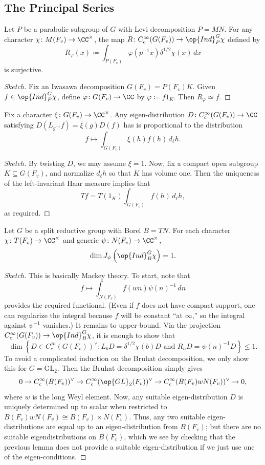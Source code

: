 \documentclass{article}
\begin{document}
\subsection{The Principal Series}
\begin{lemma}
	Let $P$ be a parabolic subgroup of $G$ with Levi decomposition $P=MN$. For any character $\chi\colon M(F_v)\to\CC^\times$, the map $R\colon C_c^\infty(G(F_v))\to\op{Ind}_P^G\chi$ defined by
	\[R_\varphi(x)\coloneqq\int_{P(F_v)}\varphi\left(p^{-1}x\right)\delta^{1/2}\chi(x)\,dx\]
	is surjective.
\end{lemma}
\begin{proof}[Sketch]
	Fix an Iwasawa decomposition $G(F_v)=P(F_v)K$. Given $f\in\op{Ind}_P^G\chi$, define $\varphi\colon G(F_v)\to\CC$ by $\varphi\coloneqq f1_K$. Then $R_\varphi\simeq f$.
\end{proof}
\begin{lemma}
	Fix a character $\xi\colon G(F_v)\to\CC^\times$. Any eigen-distribution $D\colon C_c^\infty(G(F_v))\to\CC$ satisfying $D(L_{g^{-1}}f)=\overline\xi(g)D(f)$ has is proportional to the distribution
	\[f\mapsto\int_{G(F_v)}\xi(h)f(h)\,d_\ell h.\]
\end{lemma}
\begin{proof}[Sketch]
	By twisting $D$, we may assume $\xi=1$. Now, fix a compact open subgroup $K\subseteq G(F_v)$, and normalize $d_\ell h$ so that $K$ has volume one. Then the uniqueness of the left-invariant Haar measure implies that
	\[Tf=T(1_K)\int_{G(F_v)}f(h)\,d_\ell h,\]
	as required.
\end{proof}
\begin{proposition}
	Let $G$ be a split reductive group with Borel $B=TN$. For each character $\chi\colon T(F_v)\to\CC^\times$ and generic $\psi\colon N(F_v)\to\CC^\times$,
	\[\dim J_\psi\left(\op{Ind}_B^G\chi\right)=1.\]
\end{proposition}
\begin{proof}[Sketch]
	This is basically Mackey theory. To start, note that
	\[f\mapsto\int_{N(F_v)}f(wn)\psi(n)^{-1}\,dn\]
	provides the required functional. (Even if $f$ does not have compact support, one can regularize the integral because $f$ will be constant ``at $\infty$,'' so the integral against $\psi^{-1}$ vanishes.) It remains to upper-bound. Via the projection $C_c^\infty(G(F_v))\to\op{Ind}_B^G\chi$, it is enough to show that
	\[\dim\left\{D\in C_c^\infty(G(F_v))^\lor:L_bD=\delta^{1/2}\chi(b)D\text{ and }R_nD=\psi(n)^{-1}D\right\}\le1.\]
	To avoid a complicated induction on the Bruhat decomposition, we only show this for $G=\mathrm{GL}_2$. Then the Bruhat decomposition simply gives
	\[0\to C_c^\infty(B(F_v))^\lor\to C_c^\infty(\op{GL}_2(F_v))^\lor\to C_c^\infty(B(F_v)wN(F_v))^\lor\to0,\]
	where $w$ is the long Weyl element. Now, any suitable eigen-distribution $D$ is uniquely determined up to scalar when restricted to $B(F_v)wN(F_v)\cong B(F_v)\times N(F_v)$. Thus, any two suitable eigen-distributions are equal up to an eigen-distribution from $B(F_v)$; but there are no suitable eigendistributions on $B(F_v)$, which we see by checking that the previous lemma does not provide a suitable eigen-distribution if we just use one of the eigen-conditions.
\end{proof}
\end{document}
